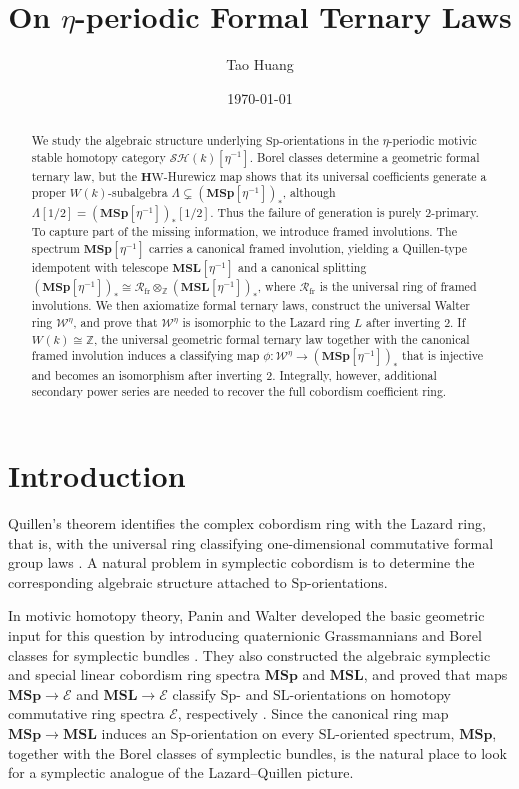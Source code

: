 \documentclass[a4paper]{amsart}
\title{On $\eta$-periodic Formal Ternary Laws}
\author{Tao Huang}
\date{\today}
\theoremstyle{plain}
\theoremstyle{definition}
\newcommand{\Sp}{\mathrm{Sp}}
\newcommand{\SL}{\mathrm{SL}}
\newcommand{\MSp}{\mathbf{MSp}}
\newcommand{\MSL}{\mathbf{MSL}}
\newcommand{\etainv}{\eta^{-1}}
\newcommand{\MSpetainv}{{\MSp[\etainv]}}
\newcommand{\MSLetainv}{{\MSL[\etainv]}}
\newcommand{\E}{\mathcal{E}}
\newcommand{\W}{\mathcal{W}^{\eta}}
\newcommand{\HW}{\mathbf{H}\mathrm{W}}
\newcommand{\SH}{\mathcal{SH}}
\newcommand{\ZZ}{\mathbb{Z}}
\newcommand{\Rfr}{\mathcal{R}_{\mathrm{fr}}}
\begin{document}
\begin{abstract}
	We study the algebraic structure underlying $\Sp$-orientations in the $\eta$-periodic motivic stable homotopy category $\SH(k)[\etainv]$. Borel classes determine a geometric formal ternary law, but the $\HW$-Hurewicz map shows that its universal coefficients generate a proper $W(k)$-subalgebra $\Lambda\subsetneq (\MSpetainv)_*$, although $\Lambda[1/2]=(\MSpetainv)_*[1/2]$. Thus the failure of generation is purely $2$-primary. To capture part of the missing information, we introduce framed involutions. The spectrum $\MSpetainv$ carries a canonical framed involution, yielding a Quillen-type idempotent with telescope $\MSLetainv$ and a canonical splitting $(\MSpetainv)_* \cong \Rfr \otimes_{\ZZ} (\MSLetainv)_*$, where $\Rfr$ is the universal ring of framed involutions. We then axiomatize formal ternary laws, construct the universal Walter ring $\W$, and prove that $\W$ is isomorphic to the Lazard ring $L$ after inverting $2$. If $W(k)\cong \ZZ$, the universal geometric formal ternary law together with the canonical framed involution induces a classifying map $\phi:\W\to (\MSpetainv)_*$ that is injective and becomes an isomorphism after inverting $2$. Integrally, however, additional secondary power series are needed to recover the full cobordism coefficient ring.
\end{abstract}

\maketitle

\section{Introduction}\label{sec:introduction}

Quillen's theorem identifies the complex cobordism ring with the Lazard ring, that is, with the universal ring classifying one-dimensional commutative formal group laws \cite{quillen1969on}. A natural problem in symplectic cobordism is to determine the corresponding algebraic structure attached to $\Sp$-orientations.

In motivic homotopy theory, Panin and Walter developed the basic geometric input for this question by introducing quaternionic Grassmannians and Borel classes for symplectic bundles \cite{panin2021quaternionic}. They also constructed the algebraic symplectic and special linear cobordism ring spectra $\MSp$ and $\MSL$, and proved that maps $\MSp \to \E$ and $\MSL \to \E$ classify $\Sp$- and $\SL$-orientations on homotopy commutative ring spectra $\E$, respectively \cite{panin2023on}. Since the canonical ring map $\MSp\to \MSL$ induces an $\Sp$-orientation on every $\SL$-oriented spectrum, $\MSp$, together with the Borel classes of symplectic bundles, is the natural place to look for a symplectic analogue of the Lazard--Quillen picture.
\end{document}
